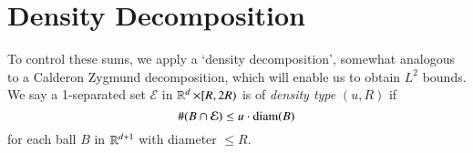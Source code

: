 \begin{comment}
\begin{proof}[Proof of Lemma \ref{lemma2} from Lemma \ref{lemma3}]
    Let
    \[ F = \sum_{(x,r) \in \mathcal{E}} \chi_{x,r} \]
    and then for $k \geq 1$, let
    \[ F_k = \sum_{(x,r) \in \mathcal{E}_k} \chi_{x,r}. \]
    Then $F = \sum_k F_k$, and. Applying a dyadic interpolation result (Lemma 2.2 of that paper), the bound
    \[ \| F_k \|_{L^r(\RR^d)} \lesssim 2^k (2^{k(d-r-1)} \#(\mathcal{E}_k)^{1/r}) \]
    which holds for $r$ to the left and right of $p$, can be interpolated to yield that
    \[ \| F \|_{L^p(\RR^d)} \lesssim \left( \sum_k 2^{kp} ( 2^{k(d-r-1)} ) \right)^{1/p} \]


    Applying a dyadic interpolation result (Lemma 2.2 of the paper), Lemma \ref{lemma3} implies that
    \[ \left\| \sum_{(x,r) \in \mathcal{E}} \chi_{x,r} \right\| \]

    \[ \left\| \sum_{(x,r) \in \mathcal{E}} \chi_{x,r} \right\|_{L^p(\RR^d)} \lesssim \left( \sum 2^{kp} 2^{k(d-p-1)} \#(\mathcal{E}_k) \right)^{1/p} = \left( \sum 2^{k(d-1)} \#(\mathcal{E}_k) \right)^{1/p} \]
    This is a restricted strong type bound for Lemma \ref{lemma2}, which we can then interpolate.
\end{proof}
\end{comment}

\section{Density Decomposition}

To control these sums, we apply a `density decomposition', somewhat analogous to a Calderon Zygmund decomposition, which will enable us to obtain $L^2$ bounds. We say a 1-separated set $\mathcal{E}$ in $\operatorname{\mathbb{R}}^d \times [R,2R)$ is of \emph{density type} $(u,R)$ if
%
\[ \#(B \cap \mathcal{E}) \leq u \cdot \operatorname{\text{diam}}(B) \]
%
for each ball $B$ in $\operatorname{\mathbb{R}}^{d+1}$ with diameter $\leq R$.

%
%

